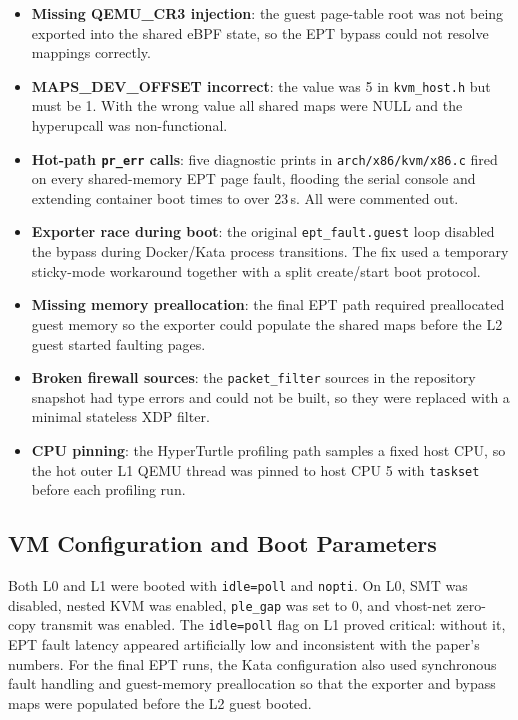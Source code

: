 \documentclass[11pt]{article}
\begin{document}
\begin{itemize}
    \item \textbf{Missing QEMU\_CR3 injection}: the guest page-table root was not being exported into the shared eBPF state, so the EPT bypass could not resolve mappings correctly.
    \item \textbf{MAPS\_DEV\_OFFSET incorrect}: the value was 5 in \texttt{kvm\_host.h} but must be 1. With the wrong value all shared maps were NULL and the hyperupcall was non-functional.
    \item \textbf{Hot-path \texttt{pr\_err} calls}: five diagnostic prints in \texttt{arch/x86/kvm/x86.c} fired on every shared-memory EPT page fault, flooding the serial console and extending container boot times to over 23\,s. All were commented out.
    \item \textbf{Exporter race during boot}: the original \texttt{ept\_fault.guest} loop disabled the bypass during Docker/Kata process transitions. The fix used a temporary sticky-mode workaround together with a split create/start boot protocol.
    \item \textbf{Missing memory preallocation}: the final EPT path required preallocated guest memory so the exporter could populate the shared maps before the L2 guest started faulting pages.
    \item \textbf{Broken firewall sources}: the \texttt{packet\_filter} sources in the repository snapshot had type errors and could not be built, so they were replaced with a minimal stateless XDP filter.
    \item \textbf{CPU pinning}: the HyperTurtle profiling path samples a fixed host CPU, so the hot outer L1 QEMU thread was pinned to host CPU 5 with \texttt{taskset} before each profiling run.
\end{itemize}

\subsection{VM Configuration and Boot Parameters}

Both L0 and L1 were booted with \texttt{idle=poll} and \texttt{nopti}. On L0, SMT was disabled, nested KVM was enabled, \texttt{ple\_gap} was set to 0, and vhost-net zero-copy transmit was enabled. The \texttt{idle=poll} flag on L1 proved critical: without it, EPT fault latency appeared artificially low and inconsistent with the paper's numbers. For the final EPT runs, the Kata configuration also used synchronous fault handling and guest-memory preallocation so that the exporter and bypass maps were populated before the L2 guest booted.
\end{document}

